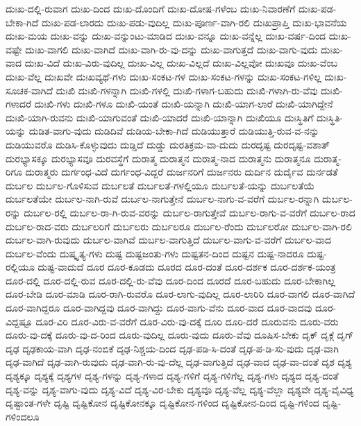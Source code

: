 {ದುಃಖ-ದಲ್ಲಿ-ರುವಾಗ
ದುಃಖ-ದಿಂದ
ದುಃಖ-ದೊಂದಿಗೆ
ದುಃಖ-ದೋಷ-ಗಳೆಂಬ
ದುಃಖ-ನಿವಾರಣೆಗೆ
ದುಃಖ-ಪಡ-ಬೇಕಾ-ಗಿದೆ
ದುಃಖ-ಪಡ-ಲಾರದು
ದುಃಖ-ಪಡು-ವುದಿಲ್ಲ
ದುಃಖ-ಪೂರ್ಣ-ವಾಗಿ-ರಲಿ
ದುಃಖಪ್ರಾಪ್ತಿ
ದುಃಖ-ಭಾವನೆಯ
ದುಃಖ-ಮಯ
ದುಃಖ-ವನ್ನು
ದುಃಖ-ವನ್ನುಂಟು-ಮಾಡಿದ
ದುಃಖ-ವನ್ನೂ
ದುಃಖ-ವನ್ನೆಲ್ಲ
ದುಃಖ-ವರ್ಷ-ದಿಂದ
ದುಃಖ-ವಷ್ಟೇ
ದುಃಖ-ವಾಗಲಿ
ದುಃಖ-ವಾಗಿದೆ
ದುಃಖ-ವಾಗಿ-ರು-ವು-ದನ್ನು
ದುಃಖ-ವಾಗುತ್ತದೆ
ದುಃಖ-ವಾಗು-ವುದು
ದುಃಖ-ವಾದ
ದುಃಖ-ವಿದೆ
ದುಃಖ-ವಿರು-ವುದಿಲ್ಲ
ದುಃಖ-ವಿಲ್ಲ
ದುಃಖ-ವಿಲ್ಲದೆ
ದುಃಖ-ವಿಲ್ಲವೋ
ದುಃಖವೂ
ದುಃಖ-ವೆಂಬ
ದುಃಖ-ವೆಲ್ಲ
ದುಃಖವೇ
ದುಃಖವ್ಯಥೆ-ಗಳು
ದುಃಖ-ಸಂಕಟ-ಗಳ
ದುಃಖ-ಸಂಕಟ-ಗಳನ್ನು
ದುಃಖ-ಸಂಕಟ-ಗಳಿಲ್ಲ
ದುಃಖ-ಸೂಚಕ-ವಾಗಿದೆ
ದುಃಖಿ
ದುಃಖಿ-ಗಳನ್ನಾಗಿ
ದುಃಖಿ-ಗಳಲ್ಲಿ
ದುಃಖಿ-ಗಳಾಗ-ಬಹುದು
ದುಃಖಿ-ಗಳಾಗಿ-ರು-ವೆವು
ದುಃಖಿ-ಗಳಾದರೆ
ದುಃಖಿ-ಗಳು
ದುಃಖಿ-ಗಳೂ
ದುಃಖಿ-ಯಂತೆ
ದುಃಖಿ-ಯನ್ನಾಗಿ
ದುಃಖಿ-ಯಾಗ-ಲಾರೆ
ದುಃಖಿ-ಯಾಗಿದ್ದೇನೆ
ದುಃಖಿ-ಯಾಗಿ-ರುವನು
ದುಃಖಿ-ಯಾಗುವಂತೆ
ದುಃಖಿ-ಯಾದರೆ
ದುಃಖಿ-ಯಾನ್ನಾಗಿ
ದುಃಖಿಯೂ
ದುಃಸ್ಥಿತಿಗೆ
ದುಃಸ್ಥಿತಿ-ಯನ್ನು
ದುಡಿತ-ವಾಗು-ವುದು
ದುಡಿದಿವೆ
ದುಡಿಯ-ಬೇಕಾ-ಗಿದೆ
ದುಡಿಯುತ್ತಾರೆ
ದುಡಿಯುತ್ತಿ-ರುವ-ವ-ನನ್ನು
ದುಡಿಯುವರೊ
ದುಡಿಸಿ-ಕೊಳ್ಳುವುದು
ದುಡ್ಡಿದೆ
ದುಡ್ಡು
ದುರತಿಕ್ರಮ-ವಾ-ದುದು
ದುರದೃಷ್ಟ
ದುರದೃಷ್ಟ-ವಶಾತ್
ದುರಭ್ಯಾಸಕ್ಕೂ
ದುರಭ್ಯಾಸವೂ
ದುರವಸ್ಥೆಗೆ
ದುರಾತ್ಮ
ದುರಾತ್ಮನ
ದುರಾತ್ಮ-ನಾದ
ದುರಾತ್ಮನು
ದುರಾತ್ಮನೂ
ದುರಾತ್ಮ-ರಿಗೂ
ದುರಾತ್ಮರು
ದುರ್ಗಂಧ-ವಿದೆ
ದುರ್ಗಂಧ-ವಿದ್ದರೆ
ದುರ್ಜನರಿಗೆ
ದುರ್ಜನರು
ದುರ್ದಿನ
ದುರ್ದೈವ
ದುರ್ನಡತೆ
ದುರ್ಬಲ
ದುರ್ಬಲ-ಗೊಳಿಸುವ
ದುರ್ಬಲತೆ
ದುರ್ಬಲತೆ-ಗಳಲ್ಲಿಯೂ
ದುರ್ಬಲತೆ-ಯನ್ನು
ದುರ್ಬಲತೆಯೆ
ದುರ್ಬಲತೆಯೇ
ದುರ್ಬಲ-ನಾಗಿ-ರುವೆ
ದುರ್ಬಲ-ನಾಗುತ್ತೇನೆ
ದುರ್ಬಲ-ನಾಗು-ವ-ವರೆಗೆ
ದುರ್ಬಲ-ರನ್ನಾಗಿ
ದುರ್ಬಲ-ರನ್ನು
ದುರ್ಬಲ-ರಲ್ಲಿ
ದುರ್ಬಲ-ರಾ-ಗಿ-ರುವ-ವರನ್ನು
ದುರ್ಬಲ-ರಾಗುತ್ತೇವೆ
ದುರ್ಬಲ-ರಾಗು-ವ-ವರೆಗೆ
ದುರ್ಬಲ-ರಾದ
ದುರ್ಬಲ-ರಾದ-ವರು
ದುರ್ಬಲರಿಗೆ
ದುರ್ಬಲರು
ದುರ್ಬಲರೂ
ದುರ್ಬಲ-ರೆಂದು
ದುರ್ಬಲರೋ
ದುರ್ಬಲ-ವಾಗಿ-ರಲಿ
ದುರ್ಬಲ-ವಾಗಿ-ರುವುದು
ದುರ್ಬಲ-ವಾಗಿವೆ
ದುರ್ಬಲ-ವಾಗುತ್ತಿದೆ
ದುರ್ಬಲ-ವಾಗು-ವ-ವರೆಗೆ
ದುರ್ಬಲ-ವಾದ
ದುರ್ಬಲ-ವೆಂದು
ದುಷ್ಕೃತ್ಯ-ಗಳು
ದುಷ್ಟ
ದುಷ್ಟಜಂತು-ಗಳು
ದುಷ್ಟತನ-ದಿಂದ
ದುಷ್ಟನ
ದುಷ್ಟ-ನಾದರೂ
ದುಷ್ಟ-ರಲ್ಲಿಯೂ
ದುಷ್ಟ-ವಾದುದೆ
ದೂರ
ದೂರ-ಕೂಡದು
ದೂರದ
ದೂರ-ದಂತೆ
ದೂರ-ದರ್ಶಕ
ದೂರ-ದರ್ಶಕ-ಯಂತ್ರ
ದೂರ-ದಲ್ಲಿ
ದೂರ-ದಲ್ಲಿ-ರುವ
ದೂರ-ದಲ್ಲಿ-ರು-ವೆವು
ದೂರ-ದಿಂದ
ದೂರದೆ
ದೂರ-ಬಹುದು
ದೂರ-ಬೇಕಾಗಿಲ್ಲ
ದೂರ-ಬೇಡಿ
ದೂರ-ಮಾಡಿ
ದೂರ-ರಾಗಿ-ರುವರೊ
ದೂರ-ಲಾಗು-ವುದಿಲ್ಲ
ದೂರ-ಲಾರಿರಿ
ದೂರ-ವಾಗಲಿ
ದೂರ-ವಾಗಿದೆ
ದೂರ-ವಾಗಿದ್ದರೂ
ದೂರ-ವಾಗಿದ್ದವು
ದೂರ-ವಾಗಿದ್ದು
ದೂರ-ವಾಗು-ವೆನು
ದೂರ-ವಾದ
ದೂರ-ವಾದವು
ದೂರ-ವಿದ್ದಷ್ಟೂ
ದೂರ-ವಿರಿ
ದೂರ-ವಿರು-ವ-ವರೆಗೆ
ದೂರ-ವಿರು-ವು-ದಕ್ಕೆ
ದೂರಿ
ದೂರಿ-ದರೆ
ದೂರುವನು
ದೂರು-ವರು
ದೂರು-ವು-ದಕ್ಕೆ
ದೂರು-ವು-ದ-ರಿಂದ
ದೂರು-ವುದಿಲ್ಲ
ದೂರು-ವುದು
ದೂರು-ವೆವು
ದೂಷಿಸ-ಬೇಕು
ದೃಕ್
ದೃಕ್ಗೆ
ದೃಗ್
ದೃಢ
ದೃಢಕಾಯ-ವಾಗಿ
ದೃಢ-ನಂಬಿಕೆ
ದೃಢ-ನಿಶ್ಚಯ-ದಿಂದ
ದೃಢ-ಪಡಿ-ಸಿ-ದಂತೆ
ದೃಢ-ಪ-ಡಿ-ಸು-ವುದು
ದೃಢ-ವಾಗಿ
ದೃಢ-ವಾಗಿದೆ
ದೃಢ-ವಾಗಿ-ರುವುದು
ದೃಢ-ವಾಗಿ-ರು-ವು-ದೆಲ್ಲ
ದೃಢ-ವಾಗುತ್ತಿದೆ
ದೃಢ-ವಾದ
ದೃಢ-ವಾ-ದಂತೆ
ದೃಶ
ದೃಶ್ಯ
ದೃಶ್ಯಕ್ಕೂ
ದೃಶ್ಯಕ್ಕೆ
ದೃಶ್ಯಗಳ
ದೃಶ್ಯ-ಗಳನ್ನು
ದೃಶ್ಯ-ಗಳಾದ
ದೃಶ್ಯ-ಗಳಿಗೆ
ದೃಶ್ಯ-ಗಳಿಗೆಲ್ಲ
ದೃಶ್ಯ-ಗಳು
ದೃಶ್ಯದ
ದೃಶ್ಯ-ದಂತೆ
ದೃಶ್ಯ-ವನ್ನು
ದೃಶ್ಯ-ವಾಗು-ವುದು
ದೃಶ್ಯ-ವಿದೆ
ದೃಶ್ಯ-ವಿರ-ಬೇಕು
ದೃಶ್ಯವೂ
ದೃಶ್ಯ-ವೆಲ್ಲ
ದೃಶ್ಯ-ವೆಲ್ಲಾ
ದೃಶ್ಯವೇ
ದೃಶ್ಯ-ವೈವಿಧ್ಯ
ದೃಷ್ಟಾಂತ-ಗಳೇ
ದೃಷ್ಟಿ
ದೃಷ್ಟಿಕೋನ
ದೃಷ್ಟಿಕೋನಕ್ಕೂ
ದೃಷ್ಟಿಕೋನ-ಗಳಿಂದ
ದೃಷ್ಟಿಕೋನ-ದಿಂದ
ದೃಷ್ಟಿ-ಗಳಿಂದ
ದೃಷ್ಟಿ-ಗಳಿಂದಲೂ
}
